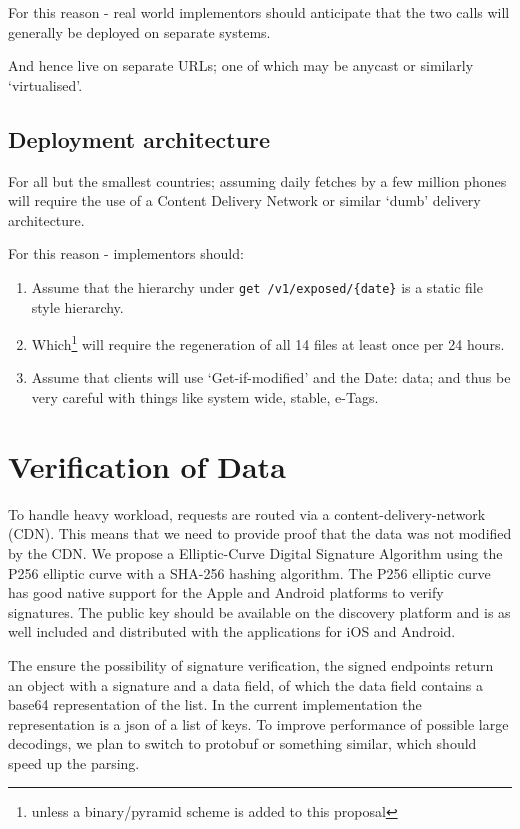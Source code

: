 For this reason - real world implementors should anticipate that the two calls will generally be deployed on separate systems. 

And hence live on separate URLs; one of which may be anycast or similarly `virtualised'.

\subsection{Deployment architecture}

For all but the smallest countries; assuming daily fetches by a few million phones will require the use of a Content Delivery Network or similar `dumb' delivery architecture. 

For this reason - implementors should:

\begin{enumerate}
\item Assume that the hierarchy under \texttt{get /v1/exposed/\{date\}} is a static file style hierarchy.
\item Which\footnote{unless a binary/pyramid scheme is added to this proposal} will require the regeneration of all 14 files at least once per 24 hours.
\item Assume that clients will use `Get-if-modified' and the Date: data; and thus be very careful with things like system wide, stable, e-Tags.
\end{enumerate}



\section{Verification of Data}
To handle heavy workload, requests are routed via a content-delivery-network (CDN). This means that we need to provide proof that the data was not modified by the CDN. We propose a Elliptic-Curve Digital Signature Algorithm using the P256 elliptic curve with a SHA-256 hashing algorithm. The P256 elliptic curve has good native support for the Apple and Android platforms to verify signatures. The public key should be available on the discovery platform and is as well included and distributed with the applications for iOS and Android.

The ensure the possibility of signature verification, the signed endpoints return an object with a signature and a data field, of which the data field contains a base64 representation of the list. In the current implementation the representation is a json of a list of keys. To improve performance of possible large decodings, we plan to switch to protobuf or something similar, which should speed up the parsing.

